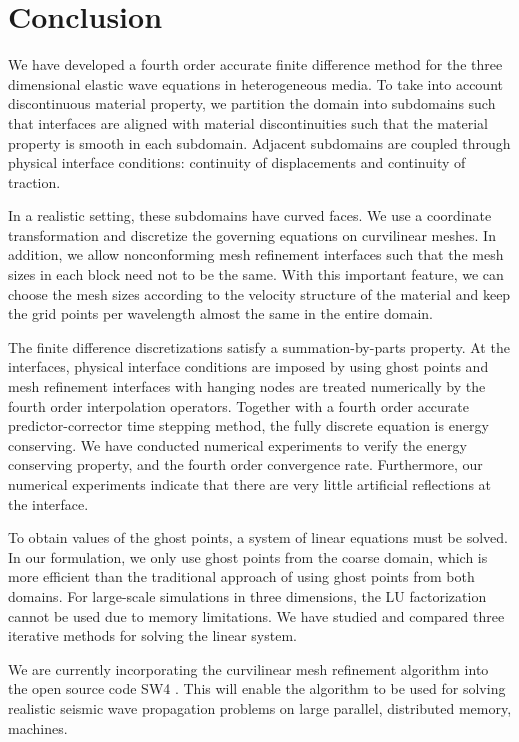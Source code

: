 \section{Conclusion}
We have developed a fourth order accurate finite difference method for the three dimensional elastic wave equations in heterogeneous media. To take into account discontinuous material property, we partition the domain into subdomains such that interfaces are aligned with material discontinuities such that the material property is smooth in each subdomain. Adjacent subdomains are coupled through physical interface conditions: continuity of displacements and continuity of traction.

In a realistic setting, these subdomains have curved faces. We use a coordinate transformation and discretize the governing equations on curvilinear meshes. In addition, we allow nonconforming mesh refinement interfaces such that the mesh sizes in each block need not to be the same. With this important feature, we can choose the mesh sizes according to the velocity structure of the material and keep the grid points per wavelength almost the same in the entire domain. 

The finite difference discretizations satisfy a summation-by-parts property. At the interfaces, physical interface conditions are imposed by using ghost points and mesh refinement interfaces with hanging nodes are treated numerically by the fourth order interpolation operators. Together with a fourth order accurate predictor-corrector time stepping method, the fully discrete equation is energy conserving. We have conducted numerical experiments to verify the energy conserving property, and the fourth order convergence rate. Furthermore, our numerical experiments indicate that there are very little artificial reflections at the interface.

To obtain values of the ghost points, a system of linear equations must be solved. In our formulation, we only use ghost points from the coarse domain, which is more efficient than the traditional approach of using ghost points from both domains.  For large-scale simulations in three dimensions, the LU factorization cannot be used due to memory limitations. We have studied and compared three iterative methods for solving the linear system.

We are currently incorporating the curvilinear mesh refinement algorithm into the open source code SW4 \cite{SW4}. This will enable the algorithm to be used for solving realistic seismic wave propagation problems on large parallel, distributed memory, machines.